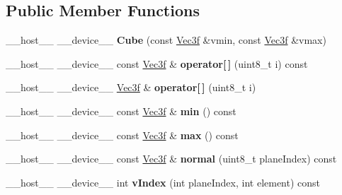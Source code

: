\subsection*{Public Member Functions}
\begin{DoxyCompactItemize}
\item 
\+\_\+\+\_\+host\+\_\+\+\_\+ \+\_\+\+\_\+device\+\_\+\+\_\+ {\bfseries Cube} (const \hyperlink{class_vec3}{Vec3f} \&vmin, const \hyperlink{class_vec3}{Vec3f} \&vmax)\hypertarget{class_cube_a2ddff6f7a6270913135aaf3631d5c47f}{}\label{class_cube_a2ddff6f7a6270913135aaf3631d5c47f}

\item 
\+\_\+\+\_\+host\+\_\+\+\_\+ \+\_\+\+\_\+device\+\_\+\+\_\+ const \hyperlink{class_vec3}{Vec3f} \& {\bfseries operator\mbox{[}$\,$\mbox{]}} (uint8\+\_\+t i) const\hypertarget{class_cube_ae4abe305069b6d146155246f0e267250}{}\label{class_cube_ae4abe305069b6d146155246f0e267250}

\item 
\+\_\+\+\_\+host\+\_\+\+\_\+ \+\_\+\+\_\+device\+\_\+\+\_\+ \hyperlink{class_vec3}{Vec3f} \& {\bfseries operator\mbox{[}$\,$\mbox{]}} (uint8\+\_\+t i)\hypertarget{class_cube_a3f54f6e6398d0c0bb7fecb211129f5a0}{}\label{class_cube_a3f54f6e6398d0c0bb7fecb211129f5a0}

\item 
\+\_\+\+\_\+host\+\_\+\+\_\+ \+\_\+\+\_\+device\+\_\+\+\_\+ const \hyperlink{class_vec3}{Vec3f} \& {\bfseries min} () const\hypertarget{class_cube_ab027298d0436ab19e9376fb6a87ec4a9}{}\label{class_cube_ab027298d0436ab19e9376fb6a87ec4a9}

\item 
\+\_\+\+\_\+host\+\_\+\+\_\+ \+\_\+\+\_\+device\+\_\+\+\_\+ const \hyperlink{class_vec3}{Vec3f} \& {\bfseries max} () const\hypertarget{class_cube_abe52067f2ab40897e3cc41c287fd725c}{}\label{class_cube_abe52067f2ab40897e3cc41c287fd725c}

\item 
\+\_\+\+\_\+host\+\_\+\+\_\+ \+\_\+\+\_\+device\+\_\+\+\_\+ const \hyperlink{class_vec3}{Vec3f} \& {\bfseries normal} (uint8\+\_\+t plane\+Index) const\hypertarget{class_cube_acb0ccb67b7bc766d2a842a800859f3c0}{}\label{class_cube_acb0ccb67b7bc766d2a842a800859f3c0}

\item 
\+\_\+\+\_\+host\+\_\+\+\_\+ \+\_\+\+\_\+device\+\_\+\+\_\+ int {\bfseries v\+Index} (int plane\+Index, int element) const\hypertarget{class_cube_a5bb5ee3421c5f40ff5c71a849b0777bf}{}\label{class_cube_a5bb5ee3421c5f40ff5c71a849b0777bf}


\end{DoxyCompactItemize}
